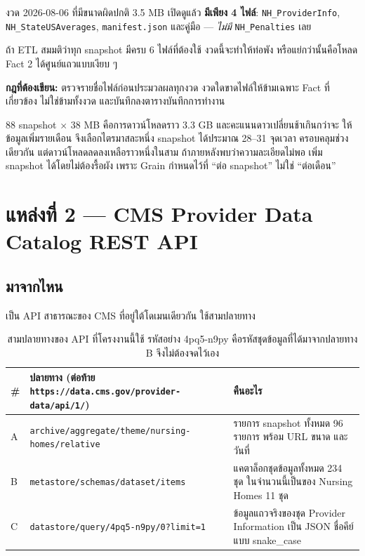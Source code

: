 \documentclass[11pt,a4paper]{article}
\newcommand{\sansall}{\sffamily}
\newcommand{\code}[1]{\texttt{#1}}
\newcommand{\ok}{\textcolor{dw}{\textbf{[ตรวจแล้ว]}}}
\begin{document}
\begin{badbox}[title={snapshot ``บางส่วน'' มีอยู่จริง และ ETL ต้องรับมือ \ok{}}]
งวด 2026-08-06 ที่มีขนาดผิดปกติ 3.5 MB เปิดดูแล้ว \textbf{มีเพียง 4 ไฟล์}:
\code{NH_ProviderInfo}, \code{NH_StateUSAverages}, \code{manifest.json}
และคู่มือ --- \emph{ไม่มี} \code{NH_Penalties} เลย

\vspace{0.3em}
ถ้า ETL สมมติว่าทุก snapshot มีครบ 6 ไฟล์ที่ต้องใช้ งวดนี้จะทำให้ท่อพัง
หรือแย่กว่านั้นคือโหลด Fact 2 ได้ศูนย์แถวแบบเงียบ ๆ

\vspace{0.3em}
\textbf{กฎที่ต้องเขียน:} ตรวจรายชื่อไฟล์ก่อนประมวลผลทุกงวด
งวดใดขาดไฟล์ให้ข้ามเฉพาะ Fact ที่เกี่ยวข้อง ไม่ใช่ข้ามทั้งงวด
และบันทึกลงตารางบันทึกการทำงาน
\end{badbox}

\begin{warnbox}[title={ขอบเขตที่ตัดสินใจไว้แล้ว: โหลดรายไตรมาส ไม่ใช่ทุกเดือน}]
88 snapshot $\times$ 38 MB คือการดาวน์โหลดราว 3.3 GB และคะแนนดาวเปลี่ยนช้าเกินกว่าจะ
ให้ข้อมูลเพิ่มรายเดือน จึงเลือกไตรมาสละหนึ่ง snapshot ได้ประมาณ 28--31 จุดเวลา
ครอบคลุมช่วงเดียวกัน แต่ดาวน์โหลดลดลงเหลือราวหนึ่งในสาม
ถ้าภายหลังพบว่าความละเอียดไม่พอ เพิ่ม snapshot ได้โดยไม่ต้องรื้อผัง
เพราะ Grain กำหนดไว้ที่ ``ต่อ snapshot'' ไม่ใช่ ``ต่อเดือน''
\end{warnbox}

\section{แหล่งที่ 2 --- CMS Provider Data Catalog REST API}

\subsection{มาจากไหน}
เป็น API สาธารณะของ CMS ที่อยู่ใต้โดเมนเดียวกัน ใช้สามปลายทาง

\begin{table}[H]\centering\small
\begin{tabular}{L{1.0cm} L{8.4cm} L{6.0cm}}
\toprule
\sansall\bfseries \# & \sansall\bfseries ปลายทาง (ต่อท้าย \code{https://data.cms.gov/provider-data/api/1/}) &
\sansall\bfseries คืนอะไร \\
\midrule
A & \code{archive/aggregate/theme/nursing-homes/relative} &
  รายการ snapshot ทั้งหมด 96 รายการ พร้อม URL ขนาด และวันที่ \\
\addlinespace
B & \code{metastore/schemas/dataset/items} &
  แคตาล็อกชุดข้อมูลทั้งหมด 234 ชุด ในจำนวนนี้เป็นของ Nursing Homes 11 ชุด \\
\addlinespace
C & \code{datastore/query/4pq5-n9py/0?limit=1} &
  ข้อมูลแถวจริงของชุด Provider Information เป็น JSON ชื่อคีย์แบบ snake\_case \\
\bottomrule
\end{tabular}
\caption{สามปลายทางของ API ที่โครงงานนี้ใช้ รหัสอย่าง 4pq5-n9py คือรหัสชุดข้อมูลที่ได้มาจากปลายทาง B จึงไม่ต้องจดไว้เอง}
\end{table}
\end{document}
